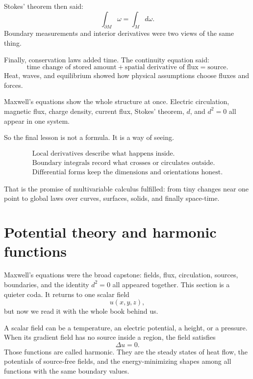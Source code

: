 Stokes' theorem then said:
\[
    \int_{\partial M}\omega=\int_M d\omega.
\]
Boundary measurements and interior derivatives were two views of the same thing.

Finally, conservation laws added time.  The continuity equation said:
\[
    \text{time change of stored amount}
    +
    \text{spatial derivative of flux}
    =
    \text{source}.
\]
Heat, waves, and equilibrium showed how physical assumptions choose fluxes and forces.

Maxwell's equations show the whole structure at once.  Electric circulation, magnetic
flux, charge density, current flux, Stokes' theorem, \(d\), and \(d^2=0\) all appear in
one system.

So the final lesson is not a formula.  It is a way of seeing.

\[
\boxed{
\begin{array}{c}
\text{Local derivatives describe what happens inside.}\\[1mm]
\text{Boundary integrals record what crosses or circulates outside.}\\[1mm]
\text{Differential forms keep the dimensions and orientations honest.}
\end{array}
}
\]

That is the promise of multivariable calculus fulfilled: from tiny changes near one
point to global laws over curves, surfaces, solids, and finally space-time.

\section{Potential theory and harmonic functions}
\label{sec:19.5}

Maxwell's equations were the broad capstone: fields, flux, circulation, sources,
boundaries, and the identity \(d^2=0\) all appeared together.  This section is a quieter
coda.  It returns to one scalar field
\[
    u(x,y,z),
\]
but now we read it with the whole book behind us.

A scalar field can be a temperature, an electric potential, a height, or a pressure.
When its gradient field has no source inside a region, the field satisfies
\[
    \Delta u=0.
\]
Those functions are called harmonic.  They are the steady states of heat flow, the
potentials of source-free fields, and the energy-minimizing shapes among all functions
with the same boundary values.

